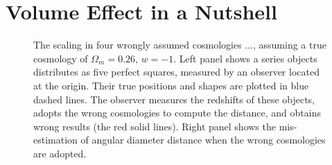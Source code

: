 \documentclass[iop]{emulateapj}
\begin{document}
\section{Volume Effect in a Nutshell}
\label{sec:Voleffect}

\begin{figure}
   \caption{\label{fig_xyquan}
   The scaling in four wrongly assumed cosmologies ..., %
   assuming a true cosmology of $\Omega_m=0.26$, $w=-1$.
   Left panel shows a series objects distributes as five perfect squares, measured by an observer located at the origin.
   Their true positions and shapes are plotted in blue dashed lines.
   The observer measures the redshifts of these objects, adopts the wrong cosmologies to compute the distance,
   and obtains wrong results (the red solid lines).
   Right panel shows the mis-estimation of angular diameter distance when the wrong cosmologies are adopted.
   }
\end{figure}
\end{document}
